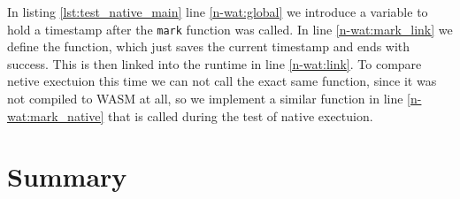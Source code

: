 

In listing \ref{lst:test_native_main} line \ref{n-wat:global} we introduce a variable to hold a timestamp after the \lstinline{mark} function was called. In line \ref{n-wat:mark_link} we define the function, which just saves the current timestamp and ends with success. This is then linked into the runtime in line \ref{n-wat:link}. To compare netive exectuion this time we can not call the exact same function, since it was not compiled to WASM at all, so we implement a similar function in line \ref{n-wat:mark_native} that is called during the test of native exectuion.

\section{Summary}